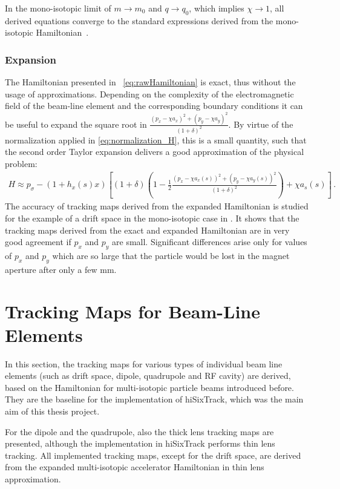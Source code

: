 In the mono-isotopic limit of $m \rightarrow m_0$ and $q \rightarrow q_0$, which implies \mbox{$\chi \rightarrow 1$}, all derived equations converge to the standard expressions derived from the mono-isotopic Hamiltonian~\cite{CERN-SL-95-12}.
%
\subsubsection{Expansion}
%
%
The Hamiltonian presented in ~\eqref{eq:rawHamiltonian} is exact, thus without the usage of approximations. Depending on the complexity of the electromagnetic field of the beam-line element and the corresponding boundary conditions it can be useful to expand the square root in $\frac{(p_x-\chi a_x)^2 + (p_y - \chi a_y)^2}{(1+\delta)^2}$. By virtue of the normalization applied in \eqref{eq:normalization_H}, this is a small quantity, such that the second order Taylor expansion delivers a good approximation of the physical problem:
\begin{align}
H \approx p_\sigma - (1+h_x(s)x) \left[ (1+\delta) \left( 1 - \frac{1}{2} \frac{(p_x - \chi a_x(s))^2 + (p_y - \chi a_y(s))^2 }{(1+\delta)^2} \right) + \chi a_s(s) \right] \, . \label{eq:expanded_hamiltonian}
\end{align}  
The accuracy of tracking maps derived from the expanded Hamiltonian is studied for the example of a drift space in the mono-isotopic case in \cite{Fjellstrom:1642385}. It shows that the tracking maps derived from the exact and expanded Hamiltonian are in very good agreement if $p_x$ and $p_y$ are small. Significant differences arise only for values of $p_x$ and $p_y$ which are so large that the particle would be lost in the magnet aperture after only a few mm.

%
%
\section{Tracking Maps for Beam-Line Elements}\label{chap:trackingmaps}
%
In this section, the tracking maps for various types of individual beam line elements (such as drift space, dipole, quadrupole and RF cavity) are derived, based on the Hamiltonian for multi-isotopic particle beams introduced before. They are the baseline for the implementation of hiSixTrack, which was the main aim of this thesis project. 

For the dipole and the quadrupole, also the thick lens tracking maps are presented, although the implementation in hiSixTrack performs thin lens tracking. All implemented tracking maps, except for the drift space, are derived from the expanded multi-isotopic accelerator Hamiltonian in thin lens approximation. 

